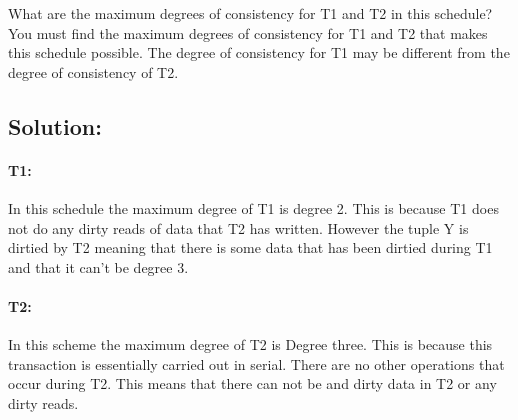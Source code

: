 \documentclass[11pt]{article}
\begin{document}
What are the maximum degrees of consistency for T1 and T2
in this schedule? You must find the maximum degrees of consistency for T1 and T2 that makes this schedule possible.
The degree of consistency for T1 may be different from the degree of consistency of T2.

\subsection{Solution:}

\paragraph{T1:} \hfill \break
	In this schedule the maximum degree of T1 is degree 2. This is because T1 does not do any dirty reads of data that T2 has written. However the tuple Y is dirtied by T2 meaning that there is some data that has been dirtied during T1 and that it can't be degree 3.\\
	
	
\paragraph{T2:} \hfill \break
In this scheme the maximum degree of T2 is Degree three. This is because this transaction is essentially carried out in serial. There are no other operations that occur during T2. This means that there can not be and dirty data in T2 or any dirty reads.\\
\end{document}
